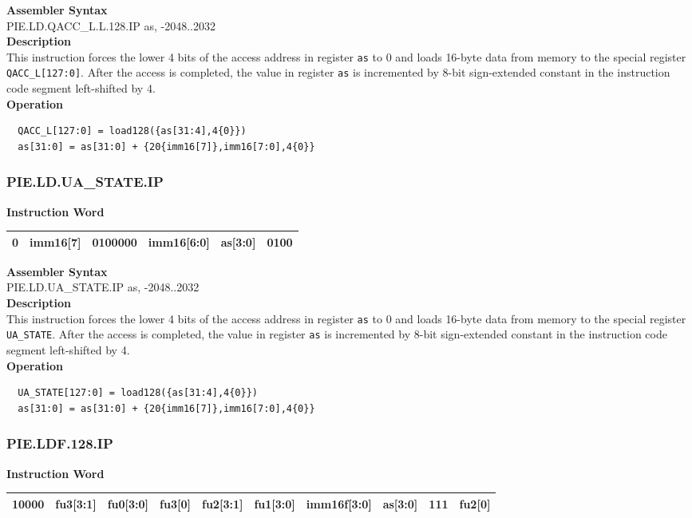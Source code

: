 \textbf{Assembler Syntax} \\
PIE.LD.QACC\_L.L.128.IP as, -2048..2032 \\
\textbf{Description} \\
This instruction forces the lower 4 bits of the access address in register \lstinline{as} to 0 and loads 16-byte data from memory to the special register \lstinline{QACC_L[127:0]}. After the access is completed, the value in register \lstinline{as} is incremented by 8-bit sign-extended constant in the instruction code segment left-shifted by 4.\\
\textbf{Operation}
\begin{lstlisting}
  QACC_L[127:0] = load128({as[31:4],4{0}})
  as[31:0] = as[31:0] + {20{imm16[7]},imm16[7:0],4{0}}
\end{lstlisting}

\newpage
\subsubsection{PIE.LD.UA\_STATE.IP}\label{instruction:PIELDUASTATEIP}
\setlength\tabcolsep{6pt}
\textbf{Instruction Word} \\
\begin{tabular}{|c|c|c|c|c|c|}
	\hline
	0 & imm16[7] & 0100000 & imm16[6:0] & as[3:0] & 0100 \\
	\hline
\end{tabular}

\textbf{Assembler Syntax} \\
PIE.LD.UA\_STATE.IP as, -2048..2032 \\
\textbf{Description} \\
This instruction forces the lower 4 bits of the access address in register \lstinline{as} to 0 and loads 16-byte data from memory to the special register \lstinline{UA_STATE}. After the access is completed, the value in register \lstinline{as} is incremented by 8-bit sign-extended constant in the instruction code segment left-shifted by 4.\\
\textbf{Operation}
\begin{lstlisting}
  UA_STATE[127:0] = load128({as[31:4],4{0}})
  as[31:0] = as[31:0] + {20{imm16[7]},imm16[7:0],4{0}}
\end{lstlisting}

\newpage
\subsubsection{PIE.LDF.128.IP}\label{instruction:PIELDF128IP}
\setlength\tabcolsep{6pt}
\textbf{Instruction Word} \\
\begin{tabular}{|c|c|c|c|c|c|c|c|c|c|}
	\hline
	10000 & fu3[3:1] & fu0[3:0] & fu3[0] & fu2[3:1] & fu1[3:0] & imm16f[3:0] & as[3:0] & 111 & fu2[0] \\
	\hline
\end{tabular}

